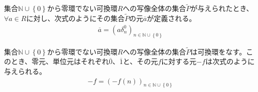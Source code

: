 \documentclass[dvipdfmx]{jsarticle}
\begin{document}
\begin{dfn}
集合$\mathbb{N} \cup \left\{ 0 \right\}$から零環でない可換環$R$への写像全体の集合$\widetilde{P}$が与えられたとき、$\forall a \in R$に対し、次式のようにその集合$\widetilde{P}$の元$\overline{a}$が定義される。
\begin{align*}
\overline{a} = \left( a\delta_{n}^{0} \right)_{n \in \mathbb{N} \cup \left\{ 0 \right\}}
\end{align*}
\end{dfn}
\begin{thm}\label{3.3.3.1}
集合$\mathbb{N} \cup \left\{ 0 \right\}$から零環でない可換環$R$への写像全体の集合$\widetilde{P}$は可換環をなす。このとき、零元、単位元はそれぞれ$\overline{0}$、$\overline{1}$と、その元$f$に対する元$- f$は次式のように与えられる。
\begin{align*}
- f = \left( - f(n) \right)_{n \in \mathbb{N} \cup \left\{ 0 \right\}}
\end{align*}
\end{thm}
\end{document}
